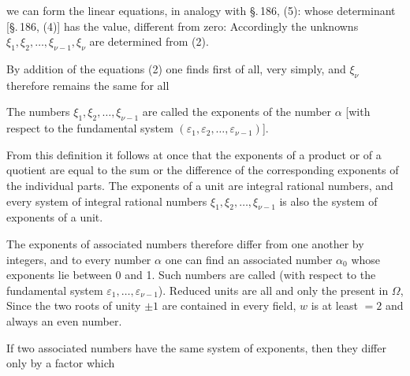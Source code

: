 we can form the linear equations, in analogy with \S.\,186, (5):
whose determinant [\S.\,186, (4)] has the value, different from zero:
Accordingly the unknowns $\xi_1, \xi_2, \ldots, \xi_{\nu-1}, \xi_\nu$ are
 determined from (2).

By addition of the equations (2) one finds first of all,
very simply,
and $\xi_\nu$ therefore remains the same for all 

The numbers $\xi_1, \xi_2, \ldots, \xi_{\nu-1}$ are called the exponents of the
number $\alpha$ [with respect to the fundamental system $(\varepsilon_1, \varepsilon_2, \ldots, \varepsilon_{\nu-1})$].

From this definition it follows at once that the
exponents of a product or of a quotient are equal to the
sum or the difference of the corresponding exponents of the
individual parts. The exponents of a unit are
integral rational numbers, and every system of integral rational numbers
$\xi_1, \xi_2, \ldots, \xi_{\nu-1}$ is also the system of exponents of a unit.

The exponents of associated numbers therefore differ
from one another by integers, and to every number $\alpha$
one can find an associated number $\alpha_0$ whose exponents lie between 0
and 1. Such numbers are called  (with
respect to the fundamental system $\varepsilon_1, \ldots, \varepsilon_{\nu-1}$). Reduced units
are all and only the  present in $\Omega$,
 Since
the two roots of unity $\pm 1$ are contained in every field,
$w$ is at least $= 2$ and always an even number.

If two associated numbers have the same system of exponents,
then they differ only by a factor which
